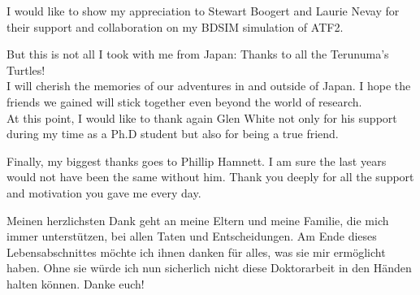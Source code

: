 \noindent I would like to show my appreciation to Stewart Boogert and Laurie Nevay for their support and collaboration on my BDSIM simulation of ATF2.

\noindent But this is not all I took with me from Japan: 
Thanks to all the Terunuma's Turtles!
\\I will cherish the memories of our adventures in and outside of Japan.
I hope the friends we gained will stick together even beyond the world of research.
\\At this point, I would like to thank again Glen White not only for his support during my time as a Ph.D student but also for being a true friend.

\noindent Finally, my biggest thanks goes to Phillip Hamnett.
I am sure the last years would not have been the same without him.
Thank you deeply for all the support and motivation you gave me every day.

\noindent Meinen herzlichsten Dank geht an meine Eltern und meine Familie, die mich immer unterst\"utzen, bei allen Taten und Entscheidungen.
Am Ende dieses Lebensabschnittes m\"ochte ich ihnen danken f\"ur alles, was sie mir erm\"oglicht haben.
Ohne sie w\"urde ich nun sicherlich nicht diese Doktorarbeit in den H\"anden halten k\"onnen.
Danke euch!